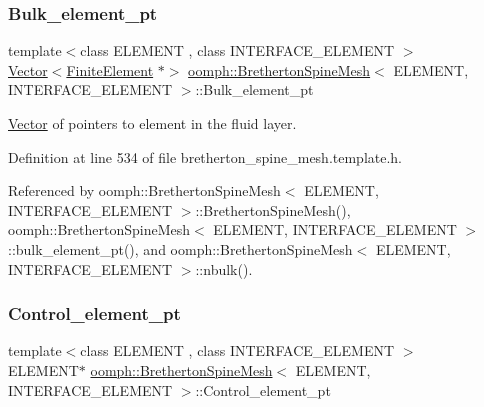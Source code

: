 \subsubsection{\texorpdfstring{Bulk\+\_\+element\+\_\+pt}{Bulk\_element\_pt}}
{\footnotesize\ttfamily template$<$class E\+L\+E\+M\+E\+NT , class I\+N\+T\+E\+R\+F\+A\+C\+E\+\_\+\+E\+L\+E\+M\+E\+NT $>$ \\
\hyperlink{classoomph_1_1Vector}{Vector}$<$\hyperlink{classoomph_1_1FiniteElement}{Finite\+Element} $\ast$$>$ \hyperlink{classoomph_1_1BrethertonSpineMesh}{oomph\+::\+Bretherton\+Spine\+Mesh}$<$ E\+L\+E\+M\+E\+NT, I\+N\+T\+E\+R\+F\+A\+C\+E\+\_\+\+E\+L\+E\+M\+E\+NT $>$\+::Bulk\+\_\+element\+\_\+pt\hspace{0.3cm}{\ttfamily [protected]}}



\hyperlink{classoomph_1_1Vector}{Vector} of pointers to element in the fluid layer. 



Definition at line 534 of file bretherton\+\_\+spine\+\_\+mesh.\+template.\+h.



Referenced by oomph\+::\+Bretherton\+Spine\+Mesh$<$ E\+L\+E\+M\+E\+N\+T, I\+N\+T\+E\+R\+F\+A\+C\+E\+\_\+\+E\+L\+E\+M\+E\+N\+T $>$\+::\+Bretherton\+Spine\+Mesh(), oomph\+::\+Bretherton\+Spine\+Mesh$<$ E\+L\+E\+M\+E\+N\+T, I\+N\+T\+E\+R\+F\+A\+C\+E\+\_\+\+E\+L\+E\+M\+E\+N\+T $>$\+::bulk\+\_\+element\+\_\+pt(), and oomph\+::\+Bretherton\+Spine\+Mesh$<$ E\+L\+E\+M\+E\+N\+T, I\+N\+T\+E\+R\+F\+A\+C\+E\+\_\+\+E\+L\+E\+M\+E\+N\+T $>$\+::nbulk().

\mbox{\label{classoomph_1_1BrethertonSpineMesh_a81ee86c0c747947dab52073c221d53c1}} 
\subsubsection{\texorpdfstring{Control\+\_\+element\+\_\+pt}{Control\_element\_pt}}
{\footnotesize\ttfamily template$<$class E\+L\+E\+M\+E\+NT , class I\+N\+T\+E\+R\+F\+A\+C\+E\+\_\+\+E\+L\+E\+M\+E\+NT $>$ \\
E\+L\+E\+M\+E\+NT$\ast$ \hyperlink{classoomph_1_1BrethertonSpineMesh}{oomph\+::\+Bretherton\+Spine\+Mesh}$<$ E\+L\+E\+M\+E\+NT, I\+N\+T\+E\+R\+F\+A\+C\+E\+\_\+\+E\+L\+E\+M\+E\+NT $>$\+::Control\+\_\+element\+\_\+pt\hspace{0.3cm}{\ttfamily [protected]}}




